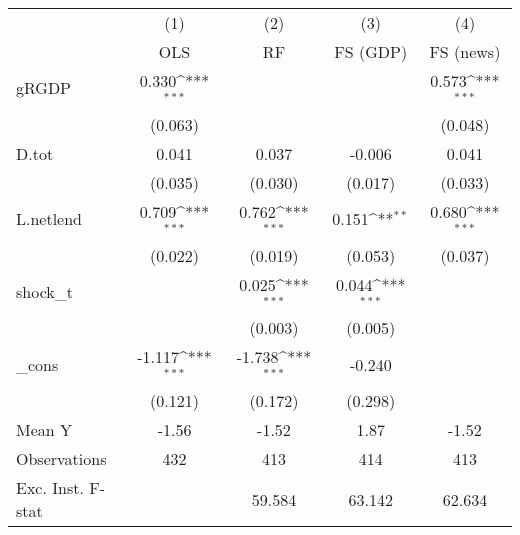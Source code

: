 {
\def\sym#1{\ifmmode^{#1}\else\(^{#1}\)\fi}
\begin{tabular}{l*{4}{c}}
\toprule
            &\multicolumn{1}{c}{(1)}&\multicolumn{1}{c}{(2)}&\multicolumn{1}{c}{(3)}&\multicolumn{1}{c}{(4)}\\
            &\multicolumn{1}{c}{OLS}&\multicolumn{1}{c}{RF}&\multicolumn{1}{c}{FS (GDP)}&\multicolumn{1}{c}{FS (news)}\\
\midrule
gRGDP       &       0.330\sym{***}&                     &                     &       0.573\sym{***}\\
            &     (0.063)         &                     &                     &     (0.048)         \\
\addlinespace
D.tot       &       0.041         &       0.037         &      -0.006         &       0.041         \\
            &     (0.035)         &     (0.030)         &     (0.017)         &     (0.033)         \\
\addlinespace
L.netlend   &       0.709\sym{***}&       0.762\sym{***}&       0.151\sym{**} &       0.680\sym{***}\\
            &     (0.022)         &     (0.019)         &     (0.053)         &     (0.037)         \\
\addlinespace
shock\_t     &                     &       0.025\sym{***}&       0.044\sym{***}&                     \\
            &                     &     (0.003)         &     (0.005)         &                     \\
\addlinespace
\_cons      &      -1.117\sym{***}&      -1.738\sym{***}&      -0.240         &                     \\
            &     (0.121)         &     (0.172)         &     (0.298)         &                     \\
\midrule
Mean Y      &       -1.56         &       -1.52         &        1.87         &       -1.52         \\
Observations&         432         &         413         &         414         &         413         \\
Exc. Inst. F-stat&                     &      59.584         &      63.142         &      62.634         \\
\bottomrule
\end{tabular}
}

